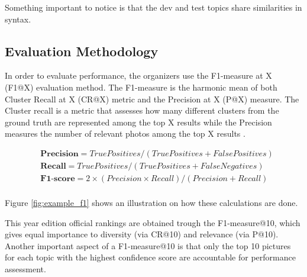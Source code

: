     Something important to notice is that the dev and test topics share similarities in syntax. 

        \subsection{Evaluation Methodology}
        \label{sec:eval}
        
        
        In order to evaluate performance, the organizers use the F1-measure at X (F1@X) evaluation method. The F1-measure is the harmonic mean of both Cluster Recall at X (CR@X) metric and the Precision at X (P@X) measure. The Cluster recall is a metric that assesses how many different clusters from the ground truth are represented among the top X results  while the Precision measures the number of  relevant photos among the top X results \cite{Ninh2020}.


     

        \begin{align*}
            &\textbf{Precision}  =  True Positives / (True Positives + False Positives) \\ 
            &\textbf{Recall}  =  True Positives / (True Positives + False Negatives) \\ 
            &\textbf{F1-score}  =  2\times(Precision \times Recall)/(Precision + Recall) \\ 
        \end{align*}
       
        
        Figure \ref{fig:example_f1} shows an illustration on how these calculations are done.

        This year edition official rankings are obtained trough the F1-measure@10, which gives equal importance to diversity (via CR@10) and relevance (via P@10). Another important aspect of a F1-measure@10 is that only the top 10 pictures for each topic with the highest confidence score are accountable for performance assessment.



